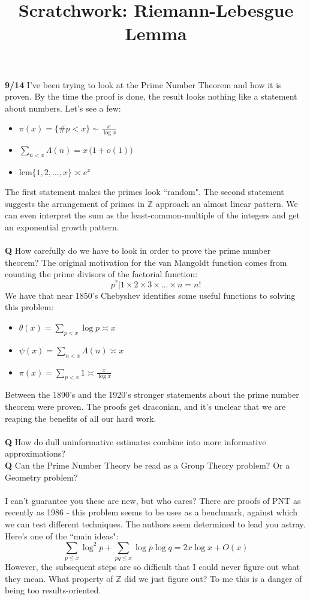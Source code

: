 \documentclass[12pt]{article}
\title{Scratchwork: Riemann-Lebesgue Lemma}
\date{}
\begin{document}
\sffamily

\maketitle

\noindent \textbf{9/14} I've been trying to look at the Prime Number Theorem and how it is proven.  By the time the proof is done, the result looks nothing like a statement about numbers.  Let's see a few:
\begin{itemize}
\item $\pi(x) = \{ \# p < x \}  \sim \frac{x}{\log x} $
\item $\displaystyle \sum_{n < x} \Lambda (n) = x \,\big(1 + o(1)\big)$
\item $\text{lcm} \{ 1, 2, \dots, x\} \asymp e^x $
\end{itemize} 
The first statement makes the primes look ``random".  The second statement suggests the arrangement of primes in $\mathbb{Z}$ approach an almost linear pattern.  We can even interpret the sum as the least-common-multiple of the integers and get an exponential growth pattern. \\ \\
\textbf{Q} How carefully do we have to look in order to prove the prime number theorem?
The original motivation for the van Mangoldt function comes from counting the prime divisors of the factorial function:
$$ p^? \big| 1 \times 2 \times 3 \times \dots \times n = n! $$
We have that near 1850's Chebyshev identifies some useful functions to solving this problem:
\begin{itemize}
\item $\displaystyle  \theta(x) = \sum_{p < x} \log p \asymp x$
\item $\displaystyle  \psi(x) = \sum_{n < x} \Lambda(n) \asymp x$
\item $\displaystyle  \pi(x) = \sum_{p < x}  1 \asymp \frac{x}{\log x}$
\end{itemize}
Between the 1890's and the 1920's stronger statements about the prime number theorem were proven.  The proofs get draconian, and it's unclear that we are reaping the benefits of all our hard work. \\ \\
\textbf{Q} How do dull uninformative estimates combine into more informative approximations?  \\
\textbf{Q} Can the Prime Number Theory be read as a Group Theory problem?  Or a Geometry problem? \\ \\
I can't guarantee you these are new, but who cares?  There are proofs of PNT as recently as 1986 - this problem seems to be uses as a benchmark, against which we can test different techniques.  The authors seem determined to lead you astray.  Here's one of the ``main ideas":
$$ \sum_{p \leq x} \log^2 p + \sum_{pq \leq x} \log p \log q= 2x \log x + O(x)$$
However, the subsequent steps are so difficult that I could never figure out what they mean.  What property of $\mathbb{Z}$ did we just figure out?  To me this is a danger of being too results-oriented.
\end{document}
